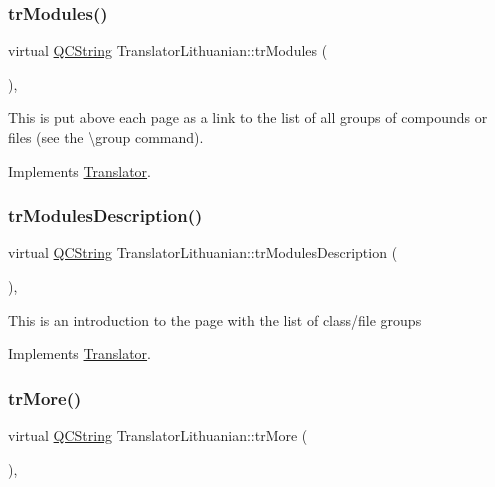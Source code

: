 \subsubsection{\texorpdfstring{trModules()}{trModules()}}
{\footnotesize\ttfamily virtual \mbox{\hyperlink{class_q_c_string}{Q\+C\+String}} Translator\+Lithuanian\+::tr\+Modules (\begin{DoxyParamCaption}{ }\end{DoxyParamCaption})\hspace{0.3cm}{\ttfamily [inline]}, {\ttfamily [virtual]}}

This is put above each page as a link to the list of all groups of compounds or files (see the \textbackslash{}group command). 

Implements \mbox{\hyperlink{class_translator}{Translator}}.

\mbox{\label{class_translator_lithuanian_a36980ea0800e9a894248a17f998dd388}} 
\subsubsection{\texorpdfstring{trModulesDescription()}{trModulesDescription()}}
{\footnotesize\ttfamily virtual \mbox{\hyperlink{class_q_c_string}{Q\+C\+String}} Translator\+Lithuanian\+::tr\+Modules\+Description (\begin{DoxyParamCaption}{ }\end{DoxyParamCaption})\hspace{0.3cm}{\ttfamily [inline]}, {\ttfamily [virtual]}}

This is an introduction to the page with the list of class/file groups 

Implements \mbox{\hyperlink{class_translator}{Translator}}.

\mbox{\label{class_translator_lithuanian_a91f7fbbb84f6142d4585d5cb64ebf410}} 
\subsubsection{\texorpdfstring{trMore()}{trMore()}}
{\footnotesize\ttfamily virtual \mbox{\hyperlink{class_q_c_string}{Q\+C\+String}} Translator\+Lithuanian\+::tr\+More (\begin{DoxyParamCaption}{ }\end{DoxyParamCaption})\hspace{0.3cm}{\ttfamily [inline]}, {\ttfamily [virtual]}}

